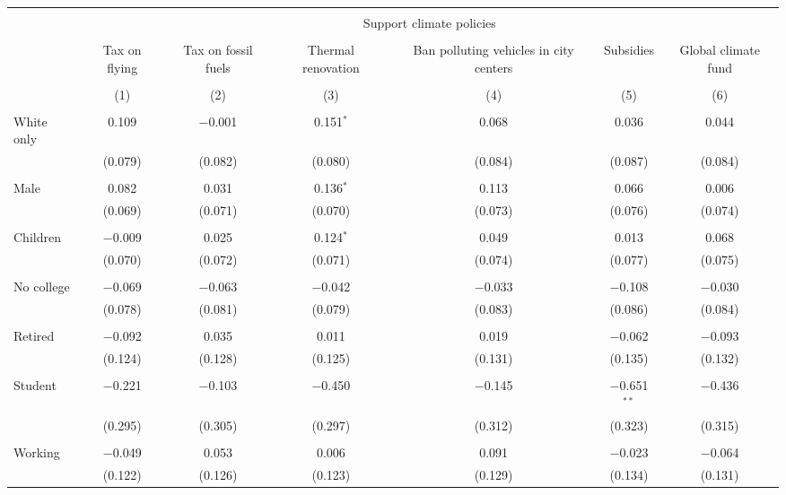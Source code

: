 
\begin{tabular}{@{\extracolsep{5pt}}lcccccc} 
\\[-1.8ex]\hline 
\hline \\[-1.8ex] 
 & \multicolumn{6}{c}{Support climate policies} \\ 
\cline{2-7} 
\\[-1.8ex] & Tax on flying & Tax on fossil fuels & Thermal renovation & Ban polluting vehicles in city centers & Subsidies & Global climate fund \\ 
\\[-1.8ex] & (1) & (2) & (3) & (4) & (5) & (6)\\ 
\hline \\[-1.8ex] 
 White only & 0.109 & $-$0.001 & 0.151$^{*}$ & 0.068 & 0.036 & 0.044 \\ 
  & (0.079) & (0.082) & (0.080) & (0.084) & (0.087) & (0.084) \\ 
  & & & & & & \\ 
 Male & 0.082 & 0.031 & 0.136$^{*}$ & 0.113 & 0.066 & 0.006 \\ 
  & (0.069) & (0.071) & (0.070) & (0.073) & (0.076) & (0.074) \\ 
  & & & & & & \\ 
 Children & $-$0.009 & 0.025 & 0.124$^{*}$ & 0.049 & 0.013 & 0.068 \\ 
  & (0.070) & (0.072) & (0.071) & (0.074) & (0.077) & (0.075) \\ 
  & & & & & & \\ 
 No college & $-$0.069 & $-$0.063 & $-$0.042 & $-$0.033 & $-$0.108 & $-$0.030 \\ 
  & (0.078) & (0.081) & (0.079) & (0.083) & (0.086) & (0.084) \\ 
  & & & & & & \\ 
 Retired & $-$0.092 & 0.035 & 0.011 & 0.019 & $-$0.062 & $-$0.093 \\ 
  & (0.124) & (0.128) & (0.125) & (0.131) & (0.135) & (0.132) \\ 
  & & & & & & \\ 
 Student & $-$0.221 & $-$0.103 & $-$0.450 & $-$0.145 & $-$0.651$^{**}$ & $-$0.436 \\ 
  & (0.295) & (0.305) & (0.297) & (0.312) & (0.323) & (0.315) \\ 
  & & & & & & \\ 
 Working & $-$0.049 & 0.053 & 0.006 & 0.091 & $-$0.023 & $-$0.064 \\ 
  & (0.122) & (0.126) & (0.123) & (0.129) & (0.134) & (0.131) \\ 

\end{tabular}
